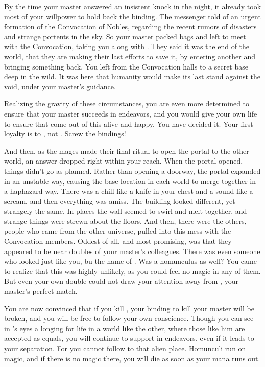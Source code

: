 \documentclass[char]{guildcamp3}
\begin{document}
	By the time your master answered an insistent knock in the night, it already took most of your willpower to hold back the binding. The messenger told \cNobleOne{} of an urgent formation of the Convocation of Nobles, regarding the recent rumors of disasters and strange portents in the sky. So your master packed \cNobleOne{\their} bags and left to meet with the Convocation, taking you along with \cNobleOne{\them}. They said it was the end of the world, that they are making their last efforts to save it, by entering another and bringing something back. You left from the Convocation halls to a secret base deep in the wild. It was here that humanity would make its last stand against the void, under your master's guidance. 
	
	Realizing the gravity of these circumstances, you are even more determined to ensure that your master succeeds in \cNobleOne{\their} endeavors, and you would give your own life to ensure that \cNobleOne{\they} come out of this alive and happy. You have decided it. Your first loyalty is to \cNobleOne{}, not \bMagicMob{}. Screw the bindings! 
	
	And then, as the mages made their final ritual to open the portal to the other world, an answer dropped right within your reach. When the portal opened, things didn't go as planned. Rather than opening a doorway, the portal expanded in an unstable way, causing the base location in each world to merge together in a haphazard way. There was a chill like a knife in your chest and a sound like a scream, and then everything was amiss. The building looked different, yet strangely the same. In places the wall seemed to swirl and melt together, and strange things were strewn about the floors. And then, there were the others, people who came from the other universe, pulled into this mess with the Convocation members. Oddest of all, and most promising, was that they appeared to be near doubles of your master's colleagues. There was even someone who looked just like you, bu the name of \cTech{}. Was \cTech{} a homunculus as well? You came to realize that this was highly unlikely, as you could feel no magic in any of them. But even your own double could not draw your attention away from \cPoliOne{}, your master's perfect match.
	
	You are now convinced that if you kill \cPoliOne{}, your binding to kill your master will be broken, and you will be free to follow your own conscience. Though you can see in \cNobleOne{}'s eyes a longing for life in a world like the other, where those like him are accepted as equals, you will continue to support \cNobleOne{\them} in \cNobleOne{\their} endeavors, even if it leads to your separation. For you cannot follow \cNobleOne{\them} to that alien place. Homunculi run on magic, and if there is no magic there, you will die as soon as your mana runs out. 
	
\end{document}

